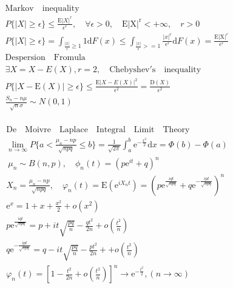 \documentclass{article}
\begin{document}
\clearpage

\begin{align*}
    \mathrm{Markov \quad inequality}\\
    P\{|X| \ge \epsilon \} \le \frac{\mathrm{E}|X|^{r}}{\epsilon^{r}}, \quad \forall \epsilon > 0, \quad \mathrm{E|X|^{r}} < + \infty, \quad r > 0\\
    P\{|X| \ge \epsilon \} = \int_{\frac{|x|}{\epsilon} \ge 1}^{} 1 \mathrm{d} F(x) \le  \int_{\frac{|x|}{\epsilon} >= 1} \frac{|x|^{r}}{\epsilon ^{r}} \mathrm{d}F(x) = \frac{\mathrm{E|X|}^{r}}{\epsilon^{r}}\\
    \mathrm{Despersion \quad Fromula} \\
    \exists X = X - E(X), r = 2, \quad \mathrm{Chebyshev's \quad inequality}\\
    P\{|X-\mathrm{E}(X)| \ge \epsilon \} \le \frac{\mathrm{E}|X-E(X)|^2}{\epsilon^{2}} = \frac{\mathrm{D}(X)}{\epsilon^{2}}\\
    \frac{S_{n}-n\mu}{\sqrt{n}\sigma} \sim N(0,1)\\
\end{align*}

\begin{align*}
    \mathrm{De \quad Moivre \quad Laplace \quad Integral \quad Limit \quad  Theory}\\
    \lim_{n \to \infty} P\{a < \frac{\mu_{n}-np}{\sqrt{npq}} \le b\} = \frac{1}{\sqrt{2\pi}}\int_{a}^{b} \mathrm{e}^{-\frac{x^2}{2}} \mathrm{d}x = \Phi(b) - \Phi(a) \\\
    \mu_{n} \sim B(n,p), \quad \phi_{n}(t) = (p\mathrm{e}^{it}+q)^{n} \\ 
    X_{n} = \frac{\mu_{n}-np}{\sqrt{npq}}, \quad \varphi_{n}(t) = \mathrm{E}(\mathrm{e}^{iX_{n}t}) = \left(p\mathrm{e}^{\frac{iqt}{\sqrt{npq}}} + q\mathrm{e}^{-\frac{ipt}{\sqrt{npq}}}\right)^{n}\\
    \mathrm{e}^{x} = 1+x+\frac{x^2}{2} + o(x^2)\\
    p\mathrm{e}^{\frac{iqt}{\sqrt{npq}}} = p+it\sqrt{\frac{pq}{n}} - \frac{qt^2}{2n} + o(\frac{t^2}{n})\\ 
    q\mathrm{e}^{-\frac{ipt}{\sqrt{npq}}} = q-it\sqrt{\frac{pq}{n}} - \frac{pt^2}{2n}+ +o(\frac{t^2}{n})\\
    \varphi_{n}(t) =\left[ 1 - \frac{t^2}{2n} + o(\frac{t^2}{n}) \right]^{n} \to \mathrm{e}^{-\frac{t^2}{2}}, (n \to \infty)\\
\end{align*}

\clearpage
\end{document}
